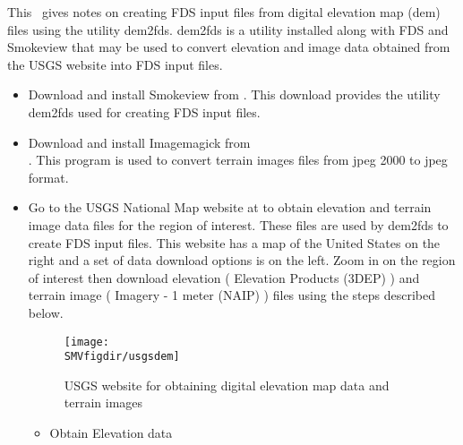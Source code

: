 
This \textchap\ gives notes on creating FDS input files from digital elevation map (dem) files using the utility dem2fds.
dem2fds is a utility installed along with FDS and Smokeview that may be used to convert elevation and image data obtained
from the USGS website  into FDS input files.


\begin{itemize}
\item Download and install Smokeview from .
This download provides the utility dem2fds used for creating FDS input files.

\item Download and install Imagemagick from \\  .
This program is used to convert terrain images files from jpeg 2000 to jpeg format.

\item Go to the USGS National Map website at  to obtain elevation and terrain image data files
for the region of interest.
These files are used by dem2fds to create FDS input files.
This website has a map of the United States on the right and a set of data download options is on the left.
Zoom in on the region of interest then download elevation ( Elevation Products (3DEP) ) and terrain image ( Imagery - 1 meter (NAIP) ) files using the steps described below.

\begin{figure}[bph]
\centerline{
\texttt{[image: \\SMVfigdir/usgsdem]}}
 \caption[FDS file overview]{USGS website for obtaining digital elevation map data and terrain images}
\label{usgswebsite}%
\end{figure}

\begin{itemize}
\item Obtain Elevation data


\end{itemize}
\end{itemize}
